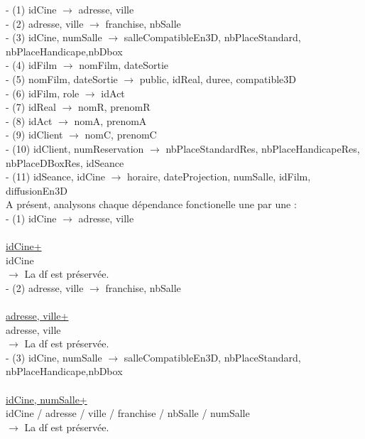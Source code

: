 \documentclass[a4paper,sffamily,12pt]{article}
\begin{document}
				\noindent- (1) idCine $\rightarrow$ adresse, ville \\
				- (2) adresse, ville $\rightarrow$ franchise, nbSalle \\
				- (3) idCine, numSalle $\rightarrow$ salleCompatibleEn3D, nbPlaceStandard, nbPlaceHandicape,nbDbox \\
		 		- (4) idFilm $\rightarrow$ nomFilm, dateSortie \\
				- (5) nomFilm, dateSortie $\rightarrow$ public, idReal, duree, compatible3D \\
				- (6) idFilm, role $\rightarrow$  idAct \\
				- (7) idReal $\rightarrow$ nomR, prenomR \\
				- (8) idAct $\rightarrow$ nomA, prenomA \\
				- (9) idClient $\rightarrow$ nomC, prenomC \\
				- (10) idClient, numReservation $\rightarrow$ nbPlaceStandardRes, nbPlaceHandicapeRes, nbPlaceDBoxRes, idSeance \\
				- (11) idSeance, idCine $\rightarrow$ horaire, dateProjection, numSalle, idFilm, diffusionEn3D \\
				
				\noindent A présent, analysons chaque dépendance fonctionelle une par une : \\
				
				\noindent - (1) idCine $\rightarrow$ adresse, ville \\
					\\
					\underline{idCine+} \\
					idCine\\									
				$\rightarrow$ La df est préservée. \\		
					
				\noindent - (2) adresse, ville $\rightarrow$ franchise, nbSalle \\
					\\
					\underline{adresse, ville+} \\
					adresse, ville \\									
				$\rightarrow$ La df est préservée. \\
				
				\noindent - (3) idCine, numSalle $\rightarrow$ salleCompatibleEn3D, nbPlaceStandard, nbPlaceHandicape,nbDbox \\
					\\
					\underline{idCine, numSalle+} \\
					idCine / adresse / ville / franchise / nbSalle / numSalle \\								
				$\rightarrow$ La df est préservée. \\													
\end{document}
